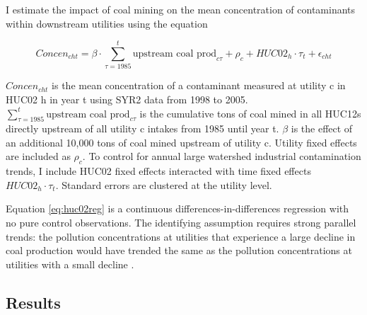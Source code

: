 \documentclass{article}
\begin{document}
I estimate the impact of coal mining on the mean concentration of contaminants within downstream utilities using the equation

\begin{equation}\label{eq:huc02reg}
    \textit{Concen}_{cht}= \beta\cdot\sum_{\tau=1985}^t\text{upstream coal prod}_{c\tau}  + \rho_c + HUC02_h\cdot\tau_t + \epsilon_{cht}
\end{equation}

$\textit{Concen}_{cht}$ is the mean concentration of a contaminant measured at utility c in HUC02 h in year t using SYR2 data from 1998 to 2005. $\sum_{\tau=1985}^t\text{upstream coal prod}_{c\tau}$ is the cumulative tons of coal mined in all HUC12s directly upstream of all utility c intakes from 1985 until year t. $\beta$ is the effect of an additional 10,000 tons of coal mined upstream of utility c. Utility fixed effects are included as $\rho_c$. To control for annual large watershed industrial contamination trends, I include HUC02 fixed effects interacted with time fixed effects $HUC02_h\cdot\tau_t$. Standard errors are clustered at the utility level.

Equation \ref{eq:huc02reg} is a continuous differences-in-differences regression with no pure control observations. The identifying assumption requires strong parallel trends: the pollution concentrations at utilities that experience a large decline in coal production would have trended the same as the pollution concentrations at utilities with a small decline \parencite{callaway2024difference}.



%

%

\subsection{Results}
\end{document}
